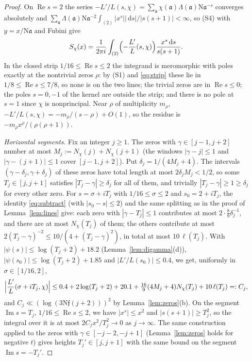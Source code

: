 \documentclass[11pt]{article}
\theoremstyle{definition}
\theoremstyle{remark}
\numberwithin{equation}{section}
\newcommand{\fa}{\mathfrak a}
\newcommand{\ff}{\mathfrak f}
\newcommand{\Nm}{\mathrm N}
\newcommand{\Rea}{\operatorname{Re}}
\newcommand{\Ima}{\operatorname{Im}}
\newcommand{\dd}{\,\mathrm{d}}
\begin{document}
\begin{proof}
On $\Rea s=2$ the series $-L'/L(s,\chi)=\sum_\fa\chi(\fa)\Lambda(\fa)\Nm\fa^{-s}$ converges absolutely and $\sum_\fa\Lambda(\fa)\Nm\fa^{-2}\int_{(2)}|x^s||\dd s|/|s(s+1)|<\infty$, so (S4) with $y=x/\Nm\fa$ and Fubini give
\begin{equation}\label{eq:perron}
 S_\chi(x)=\frac1{2\pi i}\int_{(2)}\Bigl(-\frac{L'}{L}(s,\chi)\Bigr)\frac{x^s\dd s}{s(s+1)} .
\end{equation}
In the closed strip $1/16\le\Rea s\le2$ the integrand is meromorphic with poles exactly at the nontrivial zeros $\rho$: by (S1) and \eqref{eq:strip} these lie in $1/8\le\Rea s\le7/8$, so none is on the two lines; the trivial zeros are in $\Rea s\le0$; the poles $s=0,-1$ of the kernel are outside the strip; and there is no pole at $s=1$ since $\chi$ is nonprincipal. Near $\rho$ of multiplicity $m_\rho$, $-L'/L(s,\chi)=-m_\rho/(s-\rho)+O(1)$, so the residue is $-m_\rho x^\rho/(\rho(\rho+1))$.

\emph{Horizontal segments.} Fix an integer $j\ge1$. The zeros with $\gamma\in[j-1,j+2]$ number at most $M_j:=N_\chi(j)+N_\chi(j+1)$ (the windows $|\gamma-j|\le1$ and $|\gamma-(j+1)|\le1$ cover $[j-1,j+2]$). Put $\delta_j=1/(4M_j+4)$. The intervals $(\gamma-\delta_j,\gamma+\delta_j)$ of these zeros have total length at most $2\delta_jM_j<1/2$, so some $T_j\in[j,j+1]$ satisfies $|T_j-\gamma|\ge\delta_j$ for all of them, and trivially $|T_j-\gamma|\ge1\ge\delta_j$ for every other zero. For $s=\sigma+iT_j$ with $1/16\le\sigma\le2$ and $s_0=2+iT_j$, the identity \eqref{eq:subtract} (with $|s_0-s|\le2$) and the same splitting as in the proof of Lemma~\ref{lem:lines} give: each zero with $|\gamma-T_j|\le1$ contributes at most $2\cdot\tfrac89\delta_j^{-1}$, and there are at most $N_\chi(T_j)$ of them; the others contribute at most $2(T_j-\gamma)^{-2}\le10/(4+(T_j-\gamma)^2)$, in total at most $10\,\ell(T_j)$. With $|\psi(s)|\le\log(T_j+2)+18.2$ (Lemma~\ref{lem:digamma}(d)), $|\psi(s_0)|\le\log(T_j+2)+1.85$ and $|L'/L(s_0)|\le0.4$, we get, uniformly in $\sigma\in[1/16,2]$,
\[
 \Bigl|\frac{L'}{L}(\sigma+iT_j,\chi)\Bigr|\le0.4+2\log(T_j+2)+20.1+\tfrac{16}9(4M_j+4)N_\chi(T_j)+10\,\ell(T_j)=:C_j,
\]
and $C_j\ll(\log(3\Nm\ff(j+2)))^2$ by Lemma~\ref{lem:zeros}(b). On the segment $\Ima s=T_j$, $1/16\le\Rea s\le2$, we have $|x^s|\le x^2$ and $|s(s+1)|\ge T_j^2$, so the integral over it is at most $2C_jx^2/T_j^2\to0$ as $j\to\infty$. The same construction applied to the zeros with $\gamma\in[-j-2,-j+1]$ (Lemma~\ref{lem:zeros} holds for negative $t$) gives heights $T_j'\in[j,j+1]$ with the same bound on the segment $\Ima s=-T_j'$.


\end{proof}
\end{document}
